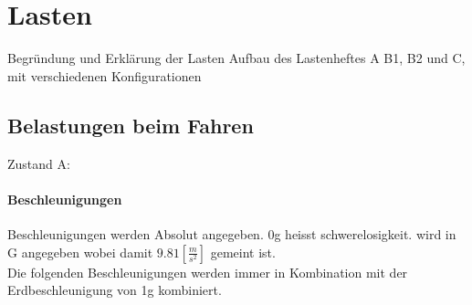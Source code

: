 \section{Lasten}
Begründung und Erklärung der Lasten
Aufbau des Lastenheftes A B1, B2 und C, mit verschiedenen Konfigurationen

\subsection{Belastungen beim Fahren}
Zustand A:


\paragraph{Beschleunigungen}
Beschleunigungen werden Absolut angegeben. 0g heisst schwerelosigkeit. wird in G angegeben wobei damit $9.81 \left[\frac{m}{s^2}\right]$ gemeint ist.\\
Die folgenden Beschleunigungen werden immer in Kombination mit der Erdbeschleunigung von 1g kombiniert.


